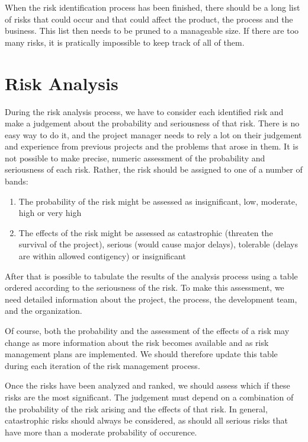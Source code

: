 When the risk identification process has been finished, there should be a long list of risks that could occur and that could affect the product, the process and the business. This list then needs to be pruned to a manageable size. If there are too many risks, it is pratically impossible to keep track of all of them.

\section{Risk Analysis}
During the risk analysis process, we have to consider each identified risk and make a judgement about the probability and seriousness of that risk. There is no easy way to do it, and the project manager needs to rely a lot on their judgement and experience from previous projects and the problems that arose in them. It is not possible to make precise, numeric assessment of the probability and seriousness of each risk. Rather, the risk should be assigned to one of a number of bands:
\begin{enumerate}
    \item The probability of the risk might be assessed as insignificant, low, moderate, high or very high
    \item The effects of the risk might be assessed as catastrophic (threaten the survival of the project), serious (would cause major delays), tolerable (delays are within allowed contigency) or insignificant
\end{enumerate}

After that is possible to tabulate the results of the analysis process using a table ordered according to the seriousness of the risk. To make this assessment, we need detailed information about the project, the process, the development team, and the organization.

Of course, both the probability and the assessment of the effects of a risk may change as more information about the risk becomes available and as risk management plans are implemented. We should therefore update this table during each iteration of the risk management process.

Once the risks have been analyzed and ranked, we should assess which if these risks are the most significant. The judgement must depend on a combination of the probability of the risk arising and the effects of that risk. In general, catastrophic risks should always be considered, as should all serious risks that have more than a moderate probability of occurence.

